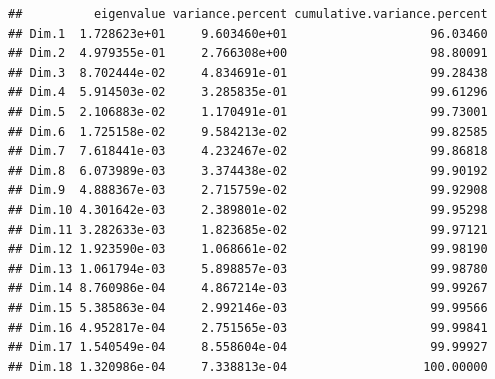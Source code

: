\documentclass[../thesis.tex]{subfiles}
\begin{document}
\newpage
\begin{Shaded}
	\begin{Highlighting}[]
\SpecialCharTok{::}
	\end{Highlighting}
\end{Shaded}

\begin{verbatim}
##          eigenvalue variance.percent cumulative.variance.percent
## Dim.1  1.728623e+01     9.603460e+01                    96.03460
## Dim.2  4.979355e-01     2.766308e+00                    98.80091
## Dim.3  8.702444e-02     4.834691e-01                    99.28438
## Dim.4  5.914503e-02     3.285835e-01                    99.61296
## Dim.5  2.106883e-02     1.170491e-01                    99.73001
## Dim.6  1.725158e-02     9.584213e-02                    99.82585
## Dim.7  7.618441e-03     4.232467e-02                    99.86818
## Dim.8  6.073989e-03     3.374438e-02                    99.90192
## Dim.9  4.888367e-03     2.715759e-02                    99.92908
## Dim.10 4.301642e-03     2.389801e-02                    99.95298
## Dim.11 3.282633e-03     1.823685e-02                    99.97121
## Dim.12 1.923590e-03     1.068661e-02                    99.98190
## Dim.13 1.061794e-03     5.898857e-03                    99.98780
## Dim.14 8.760986e-04     4.867214e-03                    99.99267
## Dim.15 5.385863e-04     2.992146e-03                    99.99566
## Dim.16 4.952817e-04     2.751565e-03                    99.99841
## Dim.17 1.540549e-04     8.558604e-04                    99.99927
## Dim.18 1.320986e-04     7.338813e-04                   100.00000
\end{verbatim}

\begin{Shaded}
	\begin{Highlighting}[]
	\end{Highlighting}
\end{Shaded}
\end{document}
